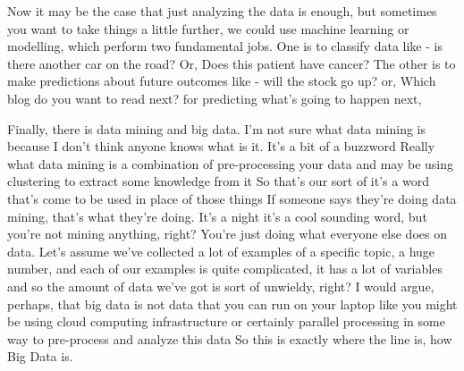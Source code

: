 Now it may be the case that just analyzing the data is enough, but sometimes you want to take things a little further,
we could use machine learning or modelling, which perform two fundamental jobs. 
One is to classify data like - is there another car on the road? Or, Does this patient have cancer? 
The other is to make predictions about future outcomes like - will the stock go up? or, Which blog do you want to read next? for predicting what's going to happen next, 

Finally, there is data mining and big data.
I'm not sure what data mining is because I don't think anyone knows what is it. It's a bit of a buzzword
Really what data mining is a combination of pre-processing your data and may be using clustering to extract some knowledge from it
So that's our sort of it's a word that's come to be used in place of those things
If someone says they're doing data mining, that's what they're doing. It's a night it's a cool sounding word, but you're not mining anything, right?
You're just doing what everyone else does on data. 
Let's assume we've collected a lot of examples of a specific topic, a huge number, and each of our examples is quite complicated, it has a lot of variables
and so the amount of data we've got is sort of unwieldy, right?
I would argue, perhaps, that big data is not data that you can run on your laptop like you might be using cloud computing infrastructure or certainly parallel processing in some way to pre-process and analyze this data
So this is exactly where the line is, how Big Data is.